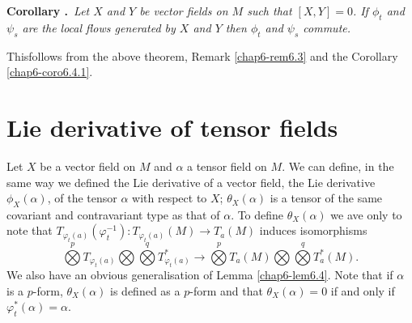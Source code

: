 \noindent
{\bf Corollary .\label{chap6-coro6.5.1}}~{\em Let\label{page26} $X$ and $Y$ be vector fields on $M$ such that $[X,Y]=0$. If $\phi_{t}$ and $\psi_{s}$ are the local flows generated by $X$ and $Y$ then $\phi_{t}$ and $\psi_{s}$ commute.}
\smallskip

This\pageoriginale follows from the above theorem, Remark \ref{chap6-rem6.3} and the Corollary \ref{chap6-coro6.4.1}.

\section*{Lie derivative of tensor fields}

Let $X$ be a vector field on $M$ and $\alpha$ a tensor field on $M$. We can define, in the same way we defined the Lie derivative of a vector field, the Lie derivative $\phi_{X}(\alpha)$, of the tensor $\alpha$ with respect to $X$; $\theta_{X}(\alpha)$ is a tensor of the same covariant and contravariant type as that of $\alpha$. To define $\theta_{X}(\alpha)$ we ave only to note that $T_{\varphi_{t}(a)}(\varphi^{-1}_{t}):T_{\varphi_{t}(a)}(M)\to T_{a}(M)$ induces isomorphisms
$$
\bigotimes\limits^{p}T_{\varphi_{t}(a)}\bigotimes \bigotimes\limits^{q}T^{*}_{\varphi_{t}(a)}\to \bigotimes\limits^{p}T_{a}(M)\bigotimes \bigotimes\limits^{q} T^{*}_{a}(M).
$$
We also have an obvious generalisation of Lemma \ref{chap6-lem6.4}. Note that if $\alpha$ is a $p$-form, $\theta_{X}(\alpha)$ is defined as a $p$-form and that $\theta_{X}(\alpha)=0$ if and only if $\varphi^{*}_{t}(\alpha)=\alpha$.

